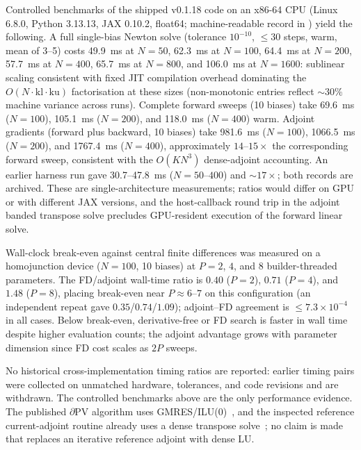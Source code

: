 Controlled benchmarks of the shipped v0.1.18 code on an x86-64 CPU
(Linux 6.8.0, Python 3.13.13, JAX 0.10.2, float64; machine-readable
record in ) yield the
following. A full single-bias Newton solve (tolerance $10^{-10}$,
$\leq30$ steps, warm, mean of 3--5) costs 49.9~ms at $N=50$, 62.3~ms at
$N=100$, 64.4~ms at $N=200$, 57.7~ms at $N=400$, 65.7~ms at $N=800$,
and 106.0~ms at $N=1600$: sublinear scaling consistent with fixed
JIT compilation overhead dominating the
$O(N\cdot\mathrm{kl}\cdot\mathrm{ku})$ factorisation at these sizes
(non-monotonic entries reflect $\sim30\%$ machine variance across
runs). Complete forward sweeps (10 biases) take 69.6~ms ($N=100$),
105.1~ms ($N=200$), and 118.0~ms ($N=400$) warm. Adjoint gradients
(forward plus backward, 10 biases) take 981.6~ms ($N=100$),
1066.5~ms ($N=200$), and 1767.4~ms ($N=400$), approximately
$14$--$15\times$ the corresponding forward sweep, consistent with the
$O(KN^3)$ dense-adjoint accounting. An earlier harness run gave
30.7--47.8~ms ($N=50$--$400$) and $\sim17\times$; both records are
archived. These are single-architecture
measurements; ratios would differ on GPU or with different JAX
versions, and the host-callback round trip in the adjoint banded transpose solve
precludes GPU-resident execution of the forward linear solve.

Wall-clock break-even against central finite differences was measured
on a homojunction device ($N=100$, 10 biases) at $P=2$, $4$, and $8$
builder-threaded parameters. The FD/adjoint wall-time ratio is $0.40$
($P=2$), $0.71$ ($P=4$), and $1.48$ ($P=8$), placing break-even near
$P\approx6$--$7$ on this configuration (an independent repeat gave
$0.35$/$0.74$/$1.09$); adjoint--FD agreement is $\leq7.3\times10^{-4}$
in all cases. Below break-even, derivative-free or FD search is faster
in wall time despite higher evaluation counts; the adjoint advantage
grows with parameter dimension since FD cost scales as $2P$ sweeps.

No historical cross-implementation timing ratios are reported: earlier
timing pairs were collected on unmatched hardware, tolerances, and code
revisions and are withdrawn. The controlled benchmarks above are the
only performance evidence. The published $\partial\mathrm{PV}$
algorithm uses GMRES/ILU(0)~\cite{mann2022partial}, and the inspected
reference current-adjoint routine already uses a dense transpose
solve~\cite{deltapvsource}; no claim is made that replaces an iterative
reference adjoint with dense LU.

